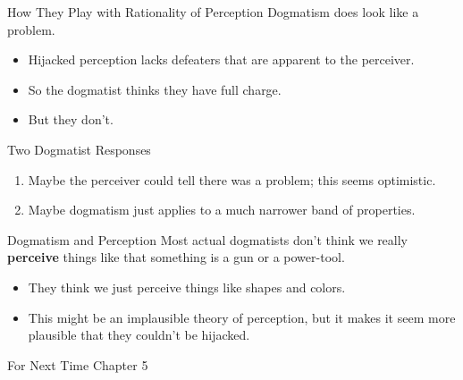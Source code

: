 \documentclass[
  17pt,
  letterpaper,
  ignorenonframetext,
  aspectratio=169,
  xcolor={dvipsnames}]{beamer}
\providecommand{\tightlist}{%
  \setlength{\itemsep}{0pt}\setlength{\parskip}{0pt}}\usepackage{longtable,booktabs,array}
\begin{document}
\begin{frame}{How They Play with Rationality of Perception}
\protect\hypertarget{how-they-play-with-rationality-of-perception-3}{}
Dogmatism does look like a problem.

\begin{itemize}[<+->]
\tightlist
\item
  Hijacked perception lacks defeaters that are apparent to the
  perceiver.
\item
  So the dogmatist thinks they have full charge.
\item
  But they don't.
\end{itemize}
\end{frame}

\begin{frame}{Two Dogmatist Responses}
\protect\hypertarget{two-dogmatist-responses}{}
\begin{enumerate}[<+->]
\tightlist
\item
  Maybe the perceiver could tell there was a problem; this seems
  optimistic.
\item
  Maybe dogmatism just applies to a much narrower band of properties.
\end{enumerate}
\end{frame}

\begin{frame}{Dogmatism and Perception}
\protect\hypertarget{dogmatism-and-perception}{}
Most actual dogmatists don't think we really \textbf{perceive} things
like that something is a gun or a power-tool.

\begin{itemize}[<+->]
\tightlist
\item
  They think we just perceive things like shapes and colors.
\item
  This might be an implausible theory of perception, but it makes it
  seem more plausible that they couldn't be hijacked.
\end{itemize}
\end{frame}

\begin{frame}{For Next Time}
\protect\hypertarget{for-next-time}{}
Chapter 5
\end{frame}
\end{document}
